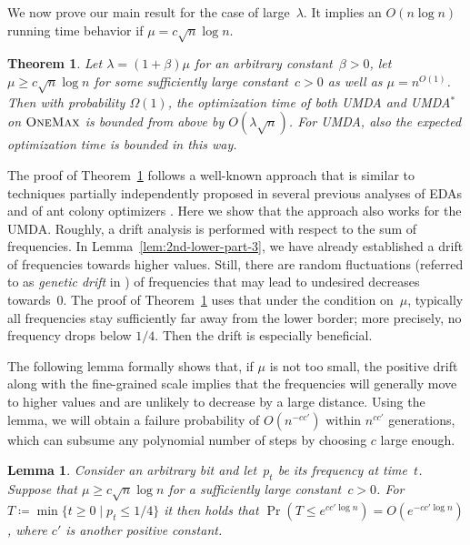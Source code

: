 \documentclass[11pt, a4paper]{article}
\newtheorem{theorem}{Theorem}
\newtheorem{lemma}{Lemma}
\newcommand*{\om}{\textsc{OneMax}\xspace}
\newcommand*{\OneMax}{\om}
\newcommand{\umdastar}{UMDA$^*$\xspace}
\newcommand{\umda}{UMDA\xspace}
\DeclareMathOperator{\Prob}{Pr}
\begin{document}
We now prove our main result for the case of large~$\lambda$. It implies an $O(n\log n)$ running time 
behavior if $\mu = c\sqrt{n}\log n$.

\begin{theorem}
\label{theo:upper-above-phase}
Let $\lambda=(1+\beta)\mu$ for an arbitrary constant~$\beta>0$, let $\mu\ge c\sqrt{n}\log n$ for some sufficiently large 
constant~$c>0$ as well as $\mu=n^{O(1)}$. Then with probability $\Omega(1)$, the optimization time of both \umda and \umdastar 
on $\OneMax$ is bounded from above 
by $O(\lambda \sqrt{n})$. For \umda, also the expected optimization time is bounded in this way.
\end{theorem}

The proof of Theorem~\ref{theo:upper-above-phase} follows a well-known approach that 
is similar to techniques 
 partially independently proposed in  
several previous analyses of EDAs and of ant 
colony optimizers  \cite{Neumann2010a, FriedrichEtAlISAAC15, SudholtWitt2016}. 
Here we show that the approach also works for the \umda. 
Roughly, a drift analysis is performed with respect to the sum of frequencies.
In Lemma~\ref{lem:2nd-lower-part-3}, we have already established a drift of 
frequencies towards higher values. Still, there are random fluctuations 
(referred to as \emph{genetic drift} in \cite{SudholtWitt2016}) of frequencies that may lead to undesired 
decreases towards~$0$. The proof of Theorem~\ref{theo:upper-above-phase}  uses that 
under the condition on~$\mu$, typically all frequencies stay sufficiently far away from the lower border;  
more precisely, no frequency 
 drops below $1/4$.  Then 
the drift is especially beneficial. 


The following lemma formally shows that, if $\mu$ is not too small, the positive drift along with 
the fine-grained scale implies  
that the frequencies will generally move to higher values and are unlikely to decrease by a large distance. 
Using the lemma, we will obtain a failure probability of $O(n^{-cc'})$ within $n^{cc'}$ generations, which 
can subsume any polynomial number of steps by choosing $c$ large enough.

\begin{lemma}
\label{lem:drift-theorem-for-probabilities}
Consider an arbitrary bit and let~$p_t$ be its frequency at time~$t$. Suppose that  
$\mu\ge c\sqrt{n}\log n$ for a sufficiently large constant~$c>0$. For $T\coloneqq \min\{t\ge 0\mid p_t\le 1/4\}$ 
it then holds  that 
$\Prob(T\le e^{cc'\log n}) = O(e^{-cc'\log n})$, where $c'$ is another positive constant.
\end{lemma}
\end{document}
